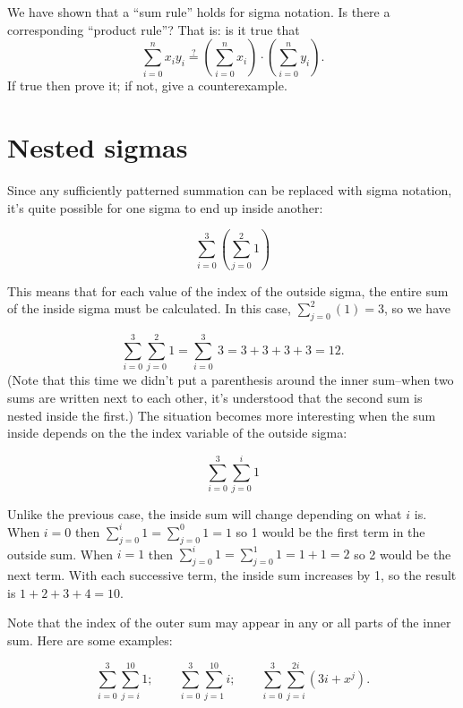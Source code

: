 \begin{exercise}{}
We have shown that a ``sum rule'' holds for sigma notation.  Is there a corresponding ``product rule''? That is: is it true that
\[ \sum_{i=0}^n x_i y_i \stackrel{?}{=} \left(\sum_{i=0}^n x_i \right) \cdot  \left(  \sum_{i=0}^n y_i \right). \]
If true then prove it; if not, give a counterexample.
\end{exercise}


\section{Nested sigmas\quad
{}} \label{sec:sigmaNested}
Since any  sufficiently patterned summation can be replaced with sigma notation, it's quite possible for one sigma to end up inside another:

\[\sum_{i=0}^{3}\left( \sum_{j=0}^{2}1\right)\]

This means that for each value of the index of the outside sigma, the entire sum of the inside sigma must be calculated.  In this case, $\sum_{j=0}^{2}(1)=3$, so we have

\[\sum_{i=0}^{3}\sum_{j=0}^{2}1 =  \sum_{i=0}^{3}\ 3  = 3+3+3+3 = 12. \]
(Note that this time we didn't put a parenthesis around the inner sum--when two sums are written next to each other, it's understood that the second sum is nested inside the first.)
The situation becomes more interesting when the sum inside depends on the the index variable of the outside sigma:

\[\sum_{i=0}^{3}\sum_{j=0}^{i}1\]

Unlike the previous case, the inside sum will change depending on what $i$ is.  When $i=0$ then $\sum_{j=0}^{i}1=\sum_{j=0}^{0}1=1$ so 1 would be the first term in the outside sum.  When $i=1$ then $\sum_{j=0}^{i}1=\sum_{j=0}^{1}1=1+1=2$ so 2 would be the next term.  With each successive term, the inside sum increases by 1, so the result is $1+2+3+4 = 10$.

 Note that the index of the outer sum may appear in any or all parts of the inner sum. Here are some examples:  

\[\sum_{i=0}^{3} \sum_{j=i}^{10}1; \qquad
\sum_{i=0}^{3} \sum_{j=1}^{10}i ; \qquad
\sum_{i=0}^{3}\sum_{j=i}^{2i}(3i+x^j).\]

